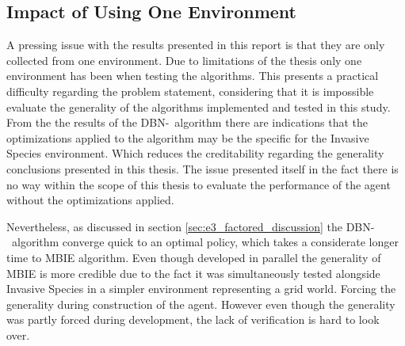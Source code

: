\subsection{Impact of Using One Environment }
A pressing issue with the results presented in this report is that they are only collected from one environment. Due to limitations of the thesis only one environment has been when testing the algorithms. This presents a practical difficulty regarding the problem statement, considering that it is impossible evaluate the generality of the algorithms implemented and tested in this study. From the the results of the DBN-\etre\ algorithm there are indications that the optimizations applied to the algorithm may be the specific for the Invasive Species environment. Which reduces the creditability regarding the generality conclusions presented in this thesis. The issue presented itself in the fact there is no way within the scope of this thesis to evaluate the performance of the agent without the optimizations applied. 

Nevertheless, as discussed in section \ref{sec:e3_factored_discussion} the DBN-\etre\ algorithm converge quick to an optimal policy, which takes a considerate longer time to MBIE algorithm. Even though developed in parallel the generality of MBIE is more credible due to the fact it was simultaneously tested alongside Invasive Species in a simpler environment representing a grid world. Forcing the generality during construction of the agent. However even though the generality was partly forced during development, the lack of verification is hard to look over. 

